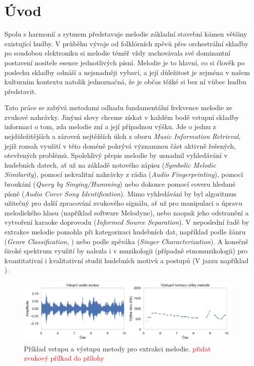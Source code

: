 \chapter{Úvod}

Spolu s harmonií a rytmem představuje melodie základní stavební kámen většiny existující hudby. V průběhu vývoje od folklórních zpěvů přes orchestrální skladby po soudobou elektroniku si melodie téměř vždy zachovávala své dominantní postavení nositele esence jednotlivých písní. Melodie je to hlavní, co si člověk po poslechu skladby odnáší a nejsnadněji vybaví, a její důležitost je zejména v našem kulturním kontextu natolik jednoznačná, že je občas těžké si bez ní vůbec hudbu představit. 

Tato práce se zabývá metodami odhadu fundamentální frekvence melodie ze zvukové nahrávky. Jinými slovy chceme získat v každém bodě vstupní skladby informaci o tom, zda melodie zní a její případnou výšku. Jde o jednu z nejdůležitějších a zároveň nejtěžších úloh z oboru \textit{Music Information Retrieval}, jejíž rozsah využití v této doméně pokrývá významnou část aktivně řešených, otevřených problémů. Spolehlivý přepis melodie by usnadnil vyhledávání v hudebních datech, ať už na základě notového zápisu (\textit{Symbolic Melodic Similarity}), pomocí nekvalitní nahrávky z rádia (\textit{Audio Fingerprinting}), pomocí broukání (\textit{Query by Singing/Humming}) nebo dokonce pomocí coveru hledané písně (\textit{Audio Cover Song Identification}). Mimo vyhledávání by byl algoritmus užitečný pro další zpracování zvukového signálu, ať už pro manipulaci a úpravu melodického hlasu (například software Melodyne), nebo naopak jeho odstranění a vytvoření karaoke doprovodu (\textit{Informed Source Separation}). V neposlední řadě by extrakce melodie pomohla při kategorizaci hudebních dat, například podle žánru (\textit{Genre Classification}, \cite{Salamon2012}) nebo podle zpěváka (\textit{Singer Characterization}). A konečně široké spektrum využití by nalezla i v muzikologii (případně etnomuzikologii) pro kvantitativní i kvalitativní studii hudebních motivů a postupů (V jazzu například \cite{Pfleiderer}).

\begin{figure}[h]\centering
\includegraphics[width=\textwidth,height=\textheight,keepaspectratio]{../img/input_output}
\caption{Příklad vstupu a výstupu metody pro extrakci melodie. \textcolor{red}{přidat zvukový přílkad do přílohy}}
\label{obr:input_output}
\end{figure}

